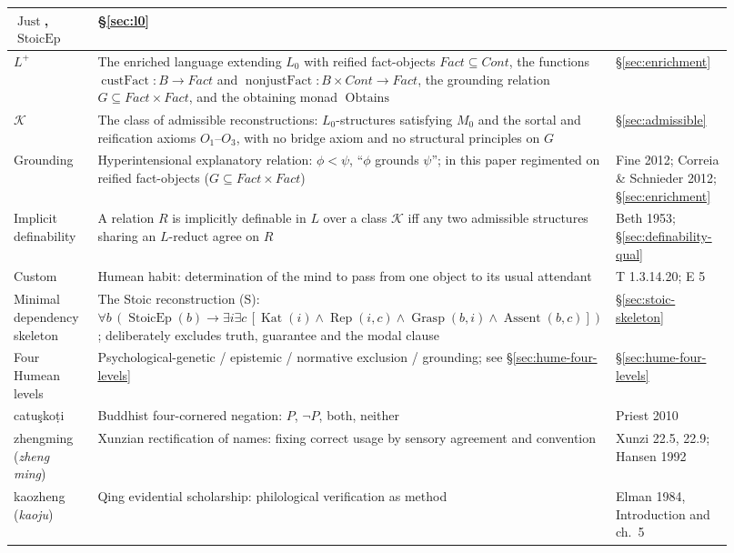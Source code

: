 \documentclass[11pt]{article}
\theoremstyle{plain}
\theoremstyle{definition}
\theoremstyle{remark}
\begin{document}
\begin{center}
\begin{longtable}{p{0.20\linewidth} p{0.44\linewidth} >{\raggedright\arraybackslash}p{0.28\linewidth}}
$\operatorname{Just}$, $\operatorname{StoicEp}$ &
\S\ref{sec:l0} \\
\hline
$L^+$ &
The enriched language extending $L_0$ with reified fact-objects
$\mathit{Fact}\subseteq\mathit{Cont}$, the functions
$\operatorname{custFact}:B\to\mathit{Fact}$ and
$\operatorname{nonjustFact}:B\times\mathit{Cont}\to\mathit{Fact}$,
the grounding relation $G\subseteq\mathit{Fact}\times\mathit{Fact}$,
and the obtaining monad $\operatorname{Obtains}$ &
\S\ref{sec:enrichment} \\
\hline
$\mathcal K$ &
The class of admissible reconstructions: $L_0$-structures satisfying
$M_0$ and the sortal and reification axioms $O_1$--$O_3$, with no
bridge axiom and no structural principles on $G$& \S\ref{sec:admissible} \\
\hline
Grounding &
Hyperintensional explanatory relation: $\phi < \psi$, ``$\phi$ grounds
$\psi$''; in this paper regimented on reified fact-objects
($G \subseteq \mathit{Fact}\times\mathit{Fact}$)& Fine 2012; Correia \& Schnieder 2012; \S\ref{sec:enrichment} \\
\hline
Implicit definability &
A relation $R$ is implicitly definable in $L$ over a class $\mathcal K$
iff any two admissible structures sharing an $L$-reduct agree on $R$& Beth 1953; \S\ref{sec:definability-qual} \\
\hline
Custom &
Humean habit: determination of the mind to pass from one object to its
usual attendant &
T 1.3.14.20; E 5 \\
\hline
Minimal dependency skeleton &
The Stoic reconstruction (S): $\forall b\,(\operatorname{StoicEp}(b)
\to \exists i\exists c\,[\operatorname{Kat}(i)\land
\operatorname{Rep}(i,c)\land \operatorname{Grasp}(b,i)\land
\operatorname{Assent}(b,c)])$; deliberately excludes truth, guarantee
and the modal clause &
\S\ref{sec:stoic-skeleton} \\
\hline
Four Humean levels &
Psychological-genetic / epistemic / normative exclusion / grounding;
see \S\ref{sec:hume-four-levels} &
\S\ref{sec:hume-four-levels} \\
\hline
catu\c{s}ko\d{t}i &
Buddhist four-cornered negation: $P$, $\neg P$, both, neither &
Priest 2010 \\
\hline
zhengming (\emph{zheng ming}) &
Xunzian rectification of names: fixing correct usage by sensory
agreement and convention &
Xunzi 22.5, 22.9; Hansen 1992 \\
\hline
kaozheng (\emph{kao\-ju}) &
Qing evidential scholarship: philological verification as method &
Elman 1984, Introduction and ch.~5 \\
\hline
\end{longtable}
\end{center}
\end{document}
